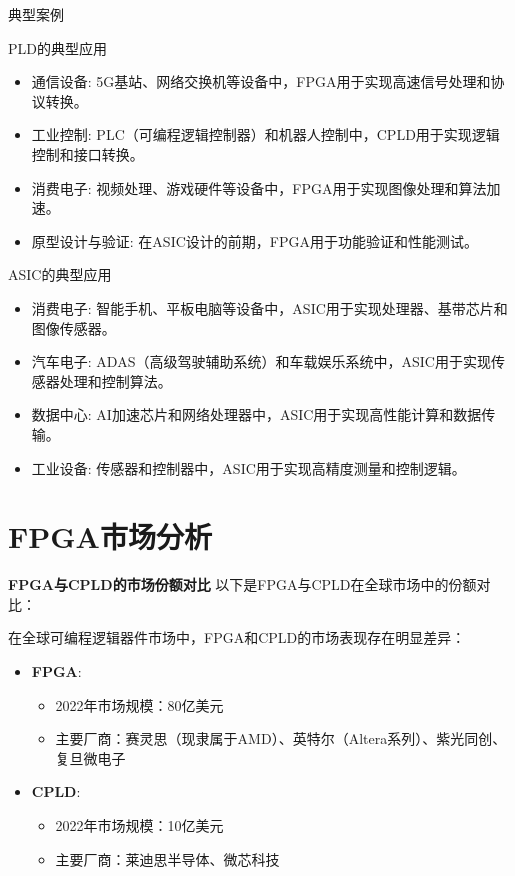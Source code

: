 \documentclass{beamer}
\providecommand{\tightlist}{%
  \setlength{\itemsep}{0pt}\setlength{\parskip}{0pt}}
\begin{document}
\begin{frame}[allowframebreaks]{典型案例}
\begin{block}{PLD的典型应用}
\begin{itemize}
\tightlist
\item
    通信设备:
    5G基站、网络交换机等设备中，FPGA用于实现高速信号处理和协议转换。
\item
    工业控制:
    PLC（可编程逻辑控制器）和机器人控制中，CPLD用于实现逻辑控制和接口转换。
\item
    消费电子: 视频处理、游戏硬件等设备中，FPGA用于实现图像处理和算法加速。
\item
    原型设计与验证: 在ASIC设计的前期，FPGA用于功能验证和性能测试。
\end{itemize}
\end{block}

\begin{block}{ASIC的典型应用}
\begin{itemize}
\tightlist
\item
    消费电子:
    智能手机、平板电脑等设备中，ASIC用于实现处理器、基带芯片和图像传感器。
\item
    汽车电子:
    ADAS（高级驾驶辅助系统）和车载娱乐系统中，ASIC用于实现传感器处理和控制算法。
\item
    数据中心: AI加速芯片和网络处理器中，ASIC用于实现高性能计算和数据传输。
\item
    工业设备: 传感器和控制器中，ASIC用于实现高精度测量和控制逻辑。
\end{itemize}
\end{block}
\end{frame}

\section{FPGA市场分析}

\begin{frame}{\textbf{FPGA与CPLD的市场份额对比}}
以下是FPGA与CPLD在全球市场中的份额对比：

在全球可编程逻辑器件市场中，FPGA和CPLD的市场表现存在明显差异：

\begin{itemize}
\tightlist
\item
    \textbf{FPGA}:

    \begin{itemize}
    \tightlist
    \item
    2022年市场规模：80亿美元
    \item
    主要厂商：赛灵思（现隶属于AMD）、英特尔（Altera系列）、紫光同创、复旦微电子
    \end{itemize}
\item
    \textbf{CPLD}:

    \begin{itemize}
    \tightlist
    \item
    2022年市场规模：10亿美元
    \item
    主要厂商：莱迪思半导体、微芯科技
    \end{itemize}
\end{itemize}
\end{frame}
\end{document}
